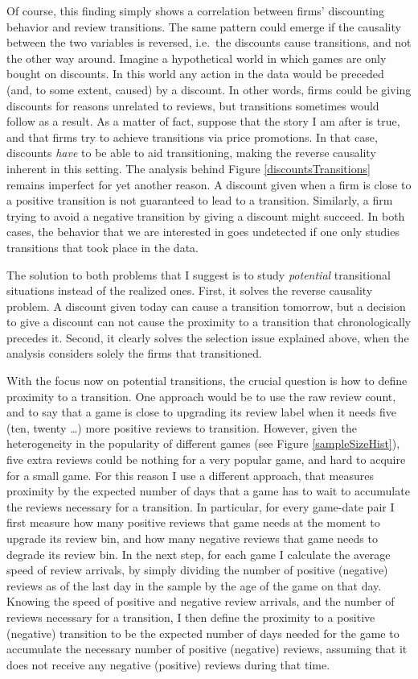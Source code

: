 \documentclass[
  12pt,
  pagebackref]{article}
\begin{document}
Of course, this finding simply shows a correlation between firms'
discounting behavior and review transitions. The same pattern could
emerge if the causality between the two variables is reversed, i.e.~the
discounts cause transitions, and not the other way around. Imagine a
hypothetical world in which games are only bought on discounts. In this
world any action in the data would be preceded (and, to some extent,
caused) by a discount. In other words, firms could be giving discounts
for reasons unrelated to reviews, but transitions sometimes would follow
as a result. As a matter of fact, suppose that the story I am after is
true, and that firms try to achieve transitions via price promotions. In
that case, discounts \emph{have} to be able to aid transitioning, making
the reverse causality inherent in this setting. The analysis behind
Figure \ref{discountsTransitions} remains imperfect for yet another
reason. A discount given when a firm is close to a positive transition
is not guaranteed to lead to a transition. Similarly, a firm trying to
avoid a negative transition by giving a discount might succeed. In both
cases, the behavior that we are interested in goes undetected if one
only studies transitions that took place in the data.

The solution to both problems that I suggest is to study
\emph{potential} transitional situations instead of the realized ones.
First, it solves the reverse causality problem. A discount given today
can cause a transition tomorrow, but a decision to give a discount can
not cause the proximity to a transition that chronologically precedes
it. Second, it clearly solves the selection issue explained above, when
the analysis considers solely the firms that transitioned.

With the focus now on potential transitions, the crucial question is how
to define proximity to a transition. One approach would be to use the
raw review count, and to say that a game is close to upgrading its
review label when it needs five (ten, twenty \ldots) more positive
reviews to transition. However, given the heterogeneity in the
popularity of different games (see Figure \ref{sampleSizeHist}), five
extra reviews could be nothing for a very popular game, and hard to
acquire for a small game. For this reason I use a different approach,
that measures proximity by the expected number of days that a game has
to wait to accumulate the reviews necessary for a transition. In
particular, for every game-date pair I first measure how many positive
reviews that game needs at the moment to upgrade its review bin, and how
many negative reviews that game needs to degrade its review bin. In the
next step, for each game I calculate the average speed of review
arrivals, by simply dividing the number of positive (negative) reviews
as of the last day in the sample by the age of the game on that day.
Knowing the speed of positive and negative review arrivals, and the
number of reviews necessary for a transition, I then define the
proximity to a positive (negative) transition to be the expected number
of days needed for the game to accumulate the necessary number of
positive (negative) reviews, assuming that it does not receive any
negative (positive) reviews during that time.
\end{document}

